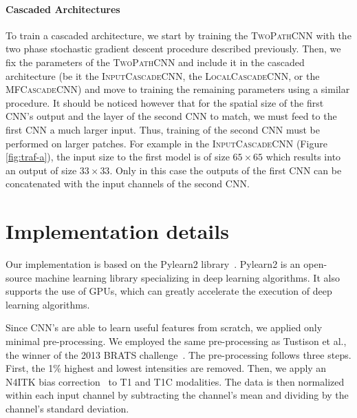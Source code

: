 \documentclass[final,5p,times,twocolumn]{elsarticle}
\begin{document}
\paragraph{Cascaded Architectures}



To train a cascaded architecture, we start by training the \textsc{TwoPathCNN} with the two phase stochastic gradient descent procedure described previously. Then, we fix the parameters of the \textsc{TwoPathCNN} and include it in the cascaded architecture (be it the \textsc{InputCascadeCNN}, the \textsc{LocalCascadeCNN}, or the \textsc{MFCascadeCNN}) and move to training the remaining parameters using a similar procedure. It should be noticed however that for the spatial size of the first CNN's output and the layer of the second CNN to match, we must feed to the first CNN a much larger input. Thus, training of the second CNN must be performed on larger patches. For example in the \textsc{InputCascadeCNN} (Figure \ref{fig:traf-a}), the input size to the first model is of size $65\times65$ which results into an output of size $33\times33$. Only in this case the outputs of the first CNN can be concatenated with the input channels of the second CNN. 








\section{Implementation details}

\label{sec:implementation}



Our implementation is based on the Pylearn2 library~\citep{pylearn2_arxiv_2013}. Pylearn2 is an open-source machine learning library specializing in deep learning algorithms. It also supports the use of GPUs, which can greatly accelerate the execution of deep learning algorithms.



Since CNN's are able to learn useful features from scratch, we applied only minimal pre-processing. We  employed the same pre-processing as Tustison et al., the winner of the 2013 BRATS challenge~\citep{Menze2014}. The pre-processing follows three steps. First, the 1\% highest and lowest intensities are removed. Then, we apply an N4ITK bias correction~\citep{avants2009advanced} to T1 and T1C modalities. 
The data is then normalized within each input channel by subtracting the channel's mean and dividing by the channel's standard deviation.
\end{document}
